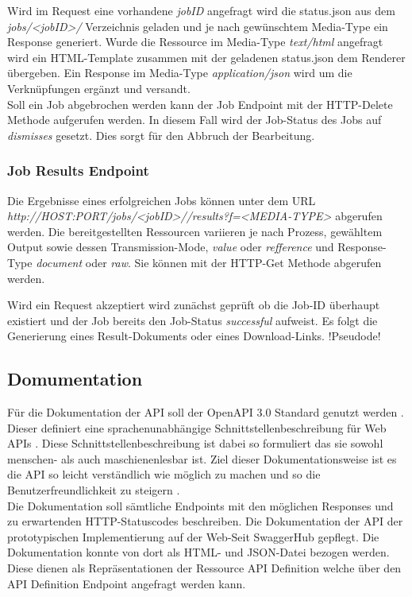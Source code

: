 Wird im Request eine vorhandene \textit{jobID} angefragt wird die status.json aus dem \textit{jobs/<jobID>/} Verzeichnis geladen und je nach gewünschtem Media-Type 
ein Response generiert. Wurde die Ressource im Media-Type \textit{text/html} angefragt wird ein HTML-Template zusammen mit der geladenen status.json 
dem Renderer übergeben.
Ein Response im Media-Type \textit{application/json} wird um die Verknüpfungen ergänzt und versandt. \\

Soll ein Job abgebrochen werden kann der Job Endpoint mit der HTTP-Delete Methode aufgerufen werden. In diesem Fall wird der Job-Status des Jobs auf \textit{dismisses} 
gesetzt. Dies sorgt für den Abbruch der Bearbeitung. 

\subsubsection{Job Results Endpoint}
Die Ergebnisse eines erfolgreichen Jobs können unter dem URL \textit{http://HOST:PORT/jobs/<jobID>//results?f=<MEDIA-TYPE>} abgerufen werden. 
Die bereitgestellten Ressourcen variieren je nach Prozess, gewähltem Output sowie dessen Transmission-Mode, \textit{value} oder \textit{refference} und Response-Type
\textit{document} oder \textit{raw}. Sie können mit der HTTP-Get Methode abgerufen werden.

Wird ein Request akzeptiert wird zunächst geprüft ob die Job-ID überhaupt existiert und der Job bereits den Job-Status \textit{successful} aufweist. 
Es folgt die Generierung eines Result-Dokuments oder eines Download-Links. 
!Pseudode!

\subsection{Domumentation}
Für die Dokumentation der API soll der OpenAPI 3.0 Standard genutzt werden \cite{ogc_api_processes_core}. 
Dieser definiert eine sprachenunabhängige Schnittstellenbeschreibung für Web APIs \cite{open_api}. 
Diese Schnittstellenbeschreibung ist dabei so formuliert das sie sowohl menschen- als auch maschienenlesbar ist. 
Ziel dieser Dokumentationsweise ist es die API so leicht verständlich wie möglich zu machen und so die Benutzerfreundlichkeit zu steigern \cite{open_api}. \\ 
Die Dokumentation soll sämtliche Endpoints mit den möglichen Responses und zu erwartenden HTTP-Statuscodes beschreiben. 
Die Dokumentation der API der prototypischen Implementierung auf der Web-Seit SwaggerHub gepflegt. Die Dokumentation konnte von dort als HTML- 
und JSON-Datei bezogen werden. Diese dienen als Repräsentationen der Ressource API Definition welche über den API Definition Endpoint angefragt werden kann. 

